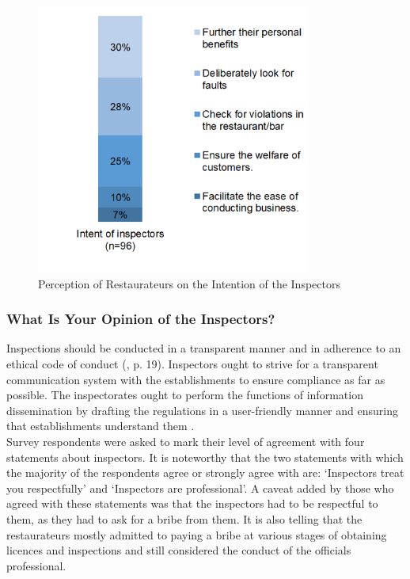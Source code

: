 \documentclass[a4paper, 12pt, twoside]{article}
\begin{document}
		\begin{figure}[H]
                    	\centering
                    	\includegraphics[height = 3.5in]{Figure7.png}
                    	\captionsetup{justification=centering}\caption[Optional Caption]{Perception of Restaurateurs on the Intention of the Inspectors} %
		\end{figure}

		\subsubsection {What Is Your Opinion of the Inspectors?}
				
		Inspections should be conducted in a transparent manner and in adherence to an ethical code of conduct (\cite{cigie2012}, p. 19). Inspectors ought to strive for a transparent communication system with the establishments to ensure compliance as far as 
possible. The inspectorates ought to perform the functions of information dissemination by drafting the regulations in a user-friendly manner and ensuring that establishments understand them \parencite{jacobs2005good}.\\
		
		Survey respondents were asked to mark their level of agreement with four statements about inspectors. It is noteworthy that the two statements with which the majority of the respondents agree or strongly agree with are: ‘Inspectors treat you respectfully’ 
and ‘Inspectors are professional’. A caveat added by those who agreed with these statements was that the inspectors had to be respectful to them, as they had to ask for a bribe from them. It is also telling that the restaurateurs mostly admitted to paying a bribe at 
various stages of obtaining licences and inspections and still considered the conduct of the officials professional.
		
\end{document}
